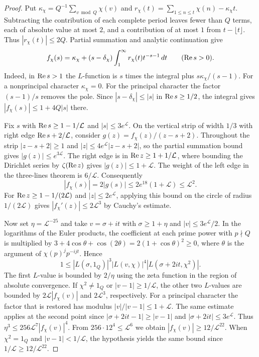 \begin{proof}
Put \(\kappa_\chi=Q^{-1}\sum_{v\bmod Q}\chi(v)\) and
\(r_\chi(t)=\sum_{1\le n\le t}\chi(n)-\kappa_\chi t\).
Subtracting the contribution of each complete period leaves fewer than \(Q\)
terms, each of absolute value at most \(2\), and a contribution of at most \(1\)
from \(t-\lfloor t\rfloor\). Thus \(|r_\chi(t)|\le2Q\).
Partial summation and analytic continuation give
\[
 f_\chi(s)=\kappa_\chi+(s-\delta_\chi)
            \int_1^\infty r_\chi(t)t^{-s-1}\,dt
 \qquad(\operatorname{Re} s>0).
\]
Indeed, in \(\operatorname{Re} s>1\) the \(L\)-function is \(s\) times the integral
plus \(s\kappa_\chi/(s-1)\). For a nonprincipal character \(\kappa_\chi=0\).
For the principal character the factor \((s-1)/s\) removes the pole.
Since \(|s-\delta_\chi|\le|s|\) in \(\operatorname{Re} s\ge1/2\), the integral gives
\(|f_\chi(s)|\le1+4Q|s|\) there.

Fix \(s\) with \(\operatorname{Re} s\ge1-1/\mathcal L\) and \(|s|\le3e^{\mathcal L}\).
On the vertical strip of width \(1/3\) with right edge
\(\operatorname{Re} s+2/\mathcal L\), consider \(g(z)=f_\chi(z)/(z-s+2)\).
Throughout the strip \(|z-s+2|\ge1\) and \(|z|\le4e^{\mathcal L}|z-s+2|\),
so the partial summation bound gives \(|g(z)|\le e^{3\mathcal L}\).
The right edge is in \(\operatorname{Re} z\ge1+1/\mathcal L\), where bounding the
Dirichlet series by \(\zeta(\operatorname{Re} z)\) gives \(|g(z)|\le1+\mathcal L\).
The weight of the left edge in the three-lines theorem is \(6/\mathcal L\).
Consequently
\[
 |f_\chi(s)|=2|g(s)|\le2e^{18}(1+\mathcal L)\le\mathcal L^2.
\]
For \(\operatorname{Re} z\ge 1-1/(2\mathcal L)\) and \(|z|\le2e^\mathcal L\), applying
this bound on the circle of radius \(1/(2\mathcal L)\) gives
\(|f_\chi'(z)|\le2\mathcal L^3\) by Cauchy's estimate.

Now set \(\eta=\mathcal L^{-25}\) and take \(v=\sigma+it\) with
\(\sigma\ge1+\eta\) and \(|v|\le3e^\mathcal L/2\).
In the logarithms of the Euler products, the coefficient at each prime
power with \(p\nmid Q\) is multiplied by
\(3+4\cos\theta+\cos(2\theta)=2(1+\cos\theta)^2\ge0\), where \(\theta\) is
the argument of \(\chi(p)^j p^{-ijt}\). Hence
\[
 1\le |L(\sigma,1_Q)|^3 |L(v,\chi)|^4 |L(\sigma+2it,\chi^2)| .
\]
The first \(L\)-value is bounded by \(2/\eta\) using the zeta function in
the region of absolute convergence. If \(\chi^2\ne1_Q\) or
\(|v-1|\ge1/\mathcal L\), the other two \(L\)-values are bounded by
\(2\mathcal L|f_\chi(v)|\) and \(2\mathcal L^3\), respectively.
For a principal character the factor that is restored has modulus
\(|v|/|v-1|\le1+\mathcal L\).
The same estimate applies at the second point since
\(|\sigma+2it-1|\ge|v-1|\) and \(|\sigma+2it|\le3e^\mathcal L\).
Thus \(\eta^3\le256\mathcal L^7|f_\chi(v)|^4\). From
\(256\cdot12^4\le\mathcal L^6\) we obtain \(|f_\chi(v)|\ge12/\mathcal L^{22}\).
When \(\chi^2=1_Q\) and \(|v-1|<1/\mathcal L\), the hypothesis yields
the same bound since \(1/\mathcal L\ge12/\mathcal L^{22}\).


\end{proof}
